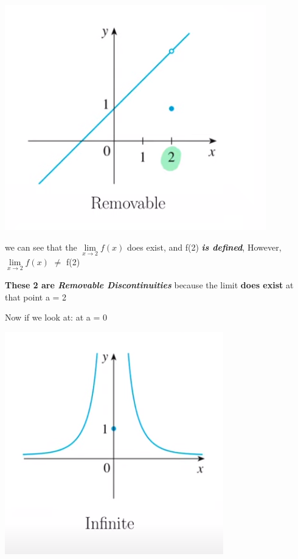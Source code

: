 \documentclass{report}
\begin{document}
        \bigbreak \noindent 
        \begin{center}
            \includegraphics[scale=0.7]{../images/2.png}
        \end{center}

        \bigbreak \noindent 
        we can see that the $\lim\limits_{x \to 2}{f \left(x\right)}$ does exist, and 
        f(2) \textbf{\textit{is defined}}, However, $\lim\limits_{x \to 2}{f \left(x\right)}$ $\neq$ f(2)

        \bigbreak \noindent \bigbreak \noindent 
        \textbf{These 2 are \textit{Removable Discontinuities}} because the limit \textbf{does exist} at that point a = 2

        \bigbreak \noindent \bigbreak \noindent 
        Now if we look at: at a = 0 

        \bigbreak \noindent 
        \begin{center}
            \includegraphics[scale=0.6]{../images/3.png}
        \end{center}
\end{document}
